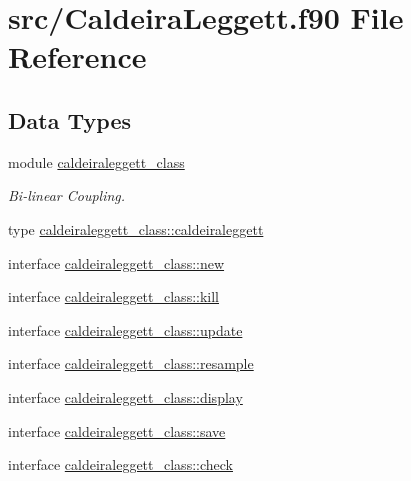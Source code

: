 \hypertarget{_caldeira_leggett_8f90}{\section{src/\+Caldeira\+Leggett.f90 File Reference}
\label{_caldeira_leggett_8f90}
}
\subsection*{Data Types}
\begin{DoxyCompactItemize}
\item 
module \hyperlink{classcaldeiraleggett__class}{caldeiraleggett\+\_\+class}
\begin{DoxyCompactList}\small\item\em Bi-\/linear Coupling. \end{DoxyCompactList}\item 
type \hyperlink{structcaldeiraleggett__class_1_1caldeiraleggett}{caldeiraleggett\+\_\+class\+::caldeiraleggett}
\item 
interface \hyperlink{interfacecaldeiraleggett__class_1_1new}{caldeiraleggett\+\_\+class\+::new}
\item 
interface \hyperlink{interfacecaldeiraleggett__class_1_1kill}{caldeiraleggett\+\_\+class\+::kill}
\item 
interface \hyperlink{interfacecaldeiraleggett__class_1_1update}{caldeiraleggett\+\_\+class\+::update}
\item 
interface \hyperlink{interfacecaldeiraleggett__class_1_1resample}{caldeiraleggett\+\_\+class\+::resample}
\item 
interface \hyperlink{interfacecaldeiraleggett__class_1_1display}{caldeiraleggett\+\_\+class\+::display}
\item 
interface \hyperlink{interfacecaldeiraleggett__class_1_1save}{caldeiraleggett\+\_\+class\+::save}
\item 
interface \hyperlink{interfacecaldeiraleggett__class_1_1check}{caldeiraleggett\+\_\+class\+::check}
\end{DoxyCompactItemize}
